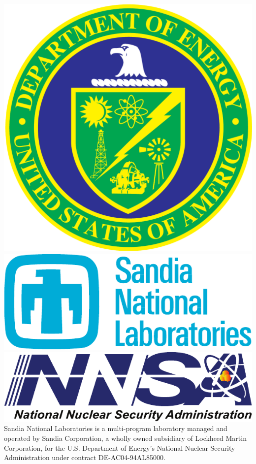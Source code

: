 \documentclass[conference]{IEEEtran}
\begin{document}
\includegraphics[scale=0.07]{logos/doe_logo}
\includegraphics[scale=0.30]{logos/snl_logo}
\includegraphics[scale=0.35]{logos/nnsa_logo}
Sandia National Laboratories is a multi-program laboratory managed and operated
by Sandia Corporation, a wholly owned subsidiary of Lockheed Martin
Corporation, for the U.S. Department of Energy's National Nuclear Security
Administration under contract DE-AC04-94AL85000.




\vfill\eject
\end{document}
